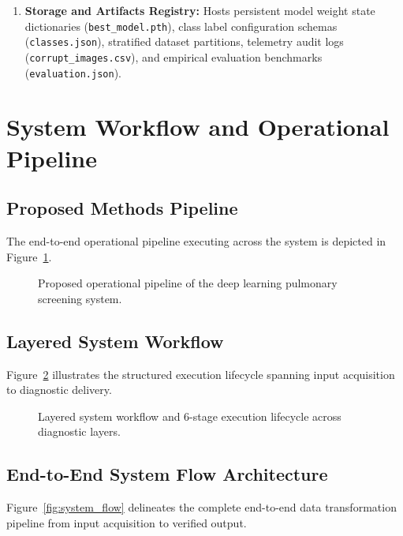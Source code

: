 \documentclass[12pt,a4paper]{report}
\begin{document}
\begin{enumerate}
    \item \textbf{Storage and Artifacts Registry:} Hosts persistent model weight state dictionaries (\texttt{best\_model.pth}), class label configuration schemas (\texttt{classes.json}), stratified dataset partitions, telemetry audit logs (\texttt{corrupt\_images.csv}), and empirical evaluation benchmarks (\texttt{evaluation.json}).
\end{enumerate}

\section{System Workflow and Operational Pipeline}

\subsection{Proposed Methods Pipeline}
The end-to-end operational pipeline executing across the system is depicted in Figure~\ref{fig:framework}.

\begin{figure}[H]
    \centering
    \caption{Proposed operational pipeline of the deep learning pulmonary screening system.}
    \label{fig:framework}
\end{figure}

\subsection{Layered System Workflow}
Figure~\ref{fig:arch_workflow} illustrates the structured execution lifecycle spanning input acquisition to diagnostic delivery.

\begin{figure}[H]
    \centering
    \caption{Layered system workflow and 6-stage execution lifecycle across diagnostic layers.}
    \label{fig:arch_workflow}
\end{figure}

\subsection{End-to-End System Flow Architecture}
Figure~\ref{fig:system_flow} delineates the complete end-to-end data transformation pipeline from input acquisition to verified output.
\end{document}

